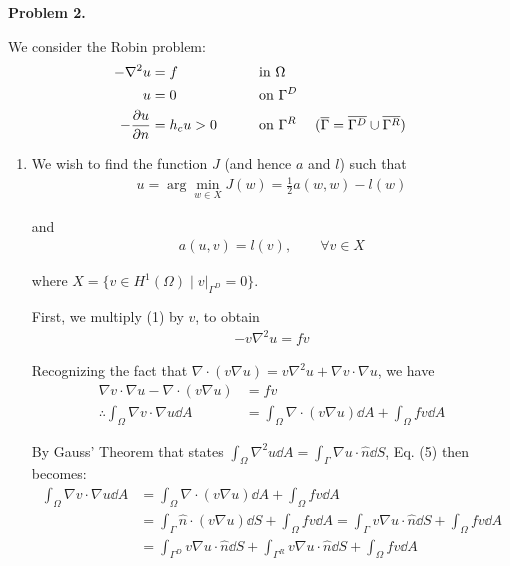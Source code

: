 \textbf{Problem 2.}

We consider the Robin problem:
\begin{alignat}{2}
    -\nabla^2u &= f \qquad&& \text{in $\Omega$} \\
    u &= 0 \qquad&& \text{on $\Gamma^D$} \\
    -\frac{\partial{u}}{\partial{n}} &= h_cu > 0 \qquad&& \text{on $\Gamma^R$ \quad ($\overline{\Gamma} = \overline{\Gamma^D} \cup \overline{\Gamma^R}$)}
\end{alignat}

\begin{enumerate}[label=(\alph*),leftmargin=*,itemsep=0mm]
    
    \item We wish to find the function $J$ (and hence $a$ and $l$) such that
    \begin{align*}
        u = \arg\min_{w\in X}J(w) = \frac{1}{2}a(w,w) - l(w)
    \end{align*}
    
    and
    \begin{align*}
        a(u,v) = l(v),\qquad \forall v\in X
    \end{align*}
    
    where $X = \{ v\in H^1(\Omega) \mid v|_{\Gamma^D} = 0 \}$.
    
    First, we multiply (1) by $v$, to obtain
    \begin{align}
        -v\nabla^2u = fv
    \end{align}
    
    Recognizing the fact that $\nabla\cdot(v\nabla u) = v\nabla^2u + \nabla v\cdot\nabla u$, we have
    \begin{align}
        \nabla v \cdot \nabla u - \nabla \cdot (v\nabla u) &= fv \nonumber \\
        \therefore \int_\Omega \nabla v \cdot \nabla u \dd{A}
        &= \int_\Omega \nabla \cdot (v\nabla u) \dd{A} + \int_\Omega fv \dd{A}
    \end{align}
    
    By Gauss' Theorem that states $\int_\Omega \nabla^2 u\dd{A} = \int_\Gamma \nabla u \cdot \hat{n} \dd{S}$, Eq. (5) then becomes:
    \begin{align}
        \int_\Omega \nabla v \cdot \nabla u \dd{A}
        &= \int_\Omega \nabla \cdot (v\nabla u) \dd{A} + \int_\Omega fv \dd{A} \nonumber \\
        &= \int_\Gamma \hat{n} \cdot (v\nabla u) \dd{S} + \int_\Omega fv \dd{A}
        =  \int_\Gamma v\nabla u \cdot \hat{n} \dd{S} + \int_\Omega fv \dd{A} \nonumber \\
        &= \int_{\Gamma^D} v\nabla u \cdot \hat{n} \dd{S}
        + \int_{\Gamma^R} v\nabla u \cdot \hat{n} \dd{S} + \int_\Omega fv \dd{A}
    \end{align}
    

\end{enumerate}
